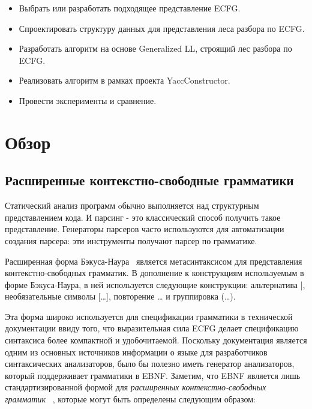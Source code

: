 \documentclass[14pt]{matmex-diploma-custom}
\begin{document}
	\begin{itemize}  
		\item Выбрать или разработать подходящее представление ECFG.
		\item Спроектировать структуру данных для представления леса разбора по ECFG.
		\item Разработать алгоритм на основе Generalized LL, строящий лес разбора по ECFG.
		\item Реализовать алгоритм в рамках проекта YaccConstructor.
		\item Провести эксперименты и сравнение.
	\end{itemize}
	
	\section{Обзор}
	
	\subsection{Расширенные контекстно-свободные грамматики}
	Статический анализ программ oбычно выполняется над структурным представлением кода. 
	И парсинг - это классический способ получить такое представление. Генераторы парсеров
	часто используются для автоматизации создания парсера: эти инструменты получают 
	парсер по грамматике.
	
	Расширенная форма Бэкуса-Наура~\cite{EBNFISO} является метасинтаксисом для представления 
	контекстно-свободных грамматик. В дополнение к конструкциям используемым в форме
	Бэкуса-Наура, в ней используется следующие конструкции: альтернатива |,
	необязательные символы [\dots], повторение {\dots} и группировка (\dots).
	
	Эта форма широко используется для спецификации грамматики в технической документации
	ввиду того, что выразительная сила ECFG делает спецификацию синтаксиса более компактной
	и удобочитаемой. Поскольку документация является одним из основных источников информации
	о языке для разработчиков синтаксических анализаторов, было бы полезно иметь генератор
	анализаторов, который поддерживает грамматики в EBNF. Заметим, что EBNF является 
	лишь стандартизированной формой для \textit{расширенных контекстно-свободных грамматик}
	~\cite{ECFG}, которые могут быть определены следующим образом:
	
\end{document}
